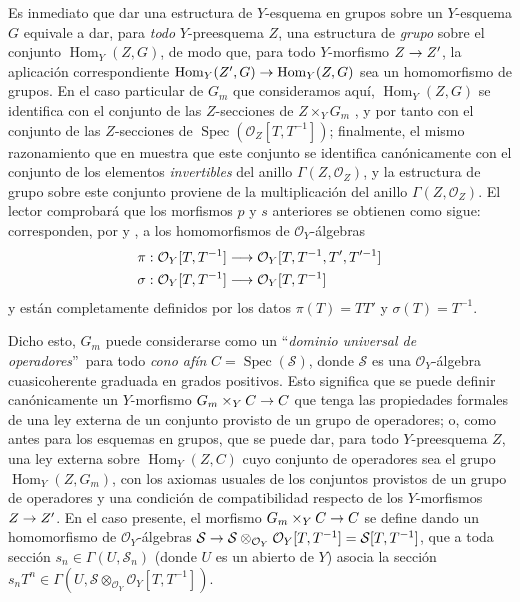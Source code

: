 \documentclass[oneside,10pt]{amsart}
\makeatletter
\newcommand{\ega@arrow}[2]{\mathchoice{#1}{#2}{#2}{#2}}
\renewcommand{\to}{\ega@arrow{\longrightarrow}{\rightarrow}}
\newcommand{\oldpage}[2][]{\marginnote{\normalfont\footnotesize\textbf{#1}~|~#2}\ignorespaces}
\makeatother
\begin{document}
\begin{remark}[8.3.9]
\oldpage[II]{167}
Es inmediato  que dar una estructura de $Y$-esquema en grupos sobre un $Y$-esquema $G$ equivale a dar, para \emph{todo} $Y$-preesquema $Z$, una estructura de \emph{grupo} sobre el conjunto $\operatorname{Hom}_Y(Z,G)$, de modo que, para todo $Y$-morfismo $Z\to Z'$, la aplicación correspondiente $\operatorname{Hom}_Y(Z',G)\to\operatorname{Hom}_Y(Z,G)$ sea un homomorfismo de grupos.
En el caso particular de $G_m$ que consideramos aquí, $\operatorname{Hom}_Y(Z,G)$ se identifica con el conjunto de las $Z$-secciones de $Z\times_YG_m$ , y por tanto con el conjunto de las $Z$-secciones de $\operatorname{Spec}(\mathcal{O}_Z[T,T^{-1}])$;
finalmente, el mismo razonamiento que en  muestra que este conjunto se identifica canónicamente con el conjunto de los elementos \emph{invertibles} del anillo $\Gamma(Z,\mathcal{O}_Z)$, y la estructura de grupo sobre este conjunto proviene de la multiplicación del anillo $\Gamma(Z,\mathcal{O}_Z)$.
El lector comprobará que los morfismos $p$ y $s$ anteriores se obtienen como sigue: corresponden, por  y , a los homomorfismos de $\mathcal{O}_Y$-álgebras
\begin{align*}
  \pi &: \mathcal{O}_Y[T,T^{-1}]
  \to\mathcal{O}_Y[T,T^{-1},T',T'^{-1}]\\
  \sigma &: \mathcal{O}_Y[T,T^{-1}]\to\mathcal{O}_Y[T,T^{-1}]
\end{align*}
y están completamente definidos por los datos $\pi(T)=TT'$ y $\sigma(T)=T^{-1}$.

Dicho esto, $G_m$ puede considerarse como un \textquotedblleft\emph{dominio universal de operadores}\textquotedblright\ para todo \emph{cono afín} $C=\operatorname{Spec}(\mathcal{S})$, donde $\mathcal{S}$ es una $\mathcal{O}_Y$-álgebra cuasicoherente graduada en grados positivos.
Esto significa que se puede definir canónicamente un $Y$-morfismo $G_m\times_YC\to C$ que tenga las propiedades formales de una ley externa de un conjunto provisto de un grupo de operadores;
o, como antes para los esquemas en grupos, que se puede dar, para todo $Y$-preesquema $Z$, una ley externa sobre $\operatorname{Hom}_Y(Z,C)$ cuyo conjunto de operadores sea el grupo $\operatorname{Hom}_Y(Z,G_m)$, con los axiomas usuales de los conjuntos provistos de un grupo de operadores y una condición de compatibilidad respecto de los $Y$-morfismos $Z\to Z'$.
En el caso presente, el morfismo $G_m\times_YC\to C$ se define dando un homomorfismo de $\mathcal{O}_Y$-álgebras $\mathcal{S}\to\mathcal{S}\otimes_{\mathcal{O}_Y}\mathcal{O}_Y[T,T^{-1}]=\mathcal{S}[T,T^{-1}]$, que a toda sección $s_n\in\Gamma(U,\mathcal{S}_n)$ (donde $U$ es un abierto de $Y$) asocia la sección $s_nT^n\in\Gamma(U,\mathcal{S}\otimes_{\mathcal{O}_Y}
\mathcal{O}_Y[T,T^{-1}])$.


\end{remark}
\end{document}
